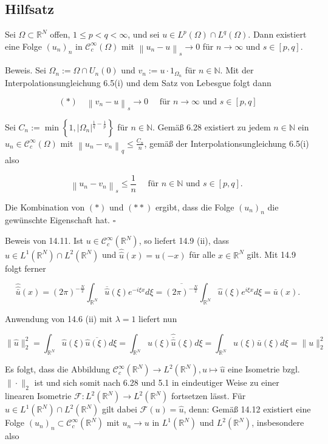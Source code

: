 \documentclass[10pt, letterpaper]{article}
\begin{document}
\subsection*{Hilfsatz}
Sei $\Omega \subset \mathbb{R}^{N}$ offen, $1 \leq p<q<\infty$, und sei $u \in L^{p}(\Omega) \cap L^{q}(\Omega)$. Dann existiert eine Folge $\left(u_{n}\right)_{n}$ in $\mathcal{C}_{c}^{\infty}(\Omega)$ mit $\left\|u_{n}-u\right\|_{s} \rightarrow 0$ für $n \rightarrow \infty$ und $s \in[p, q]$.

Beweis. Sei $\Omega_{n}:=\Omega \cap U_{n}(0)$ und $v_{n}:=u \cdot 1_{\Omega_{n}}$ für $n \in \mathbb{N}$. Mit der Interpolationsungleichung 6.5(i) und dem Satz von Lebesgue folgt dann

$$
(*) \quad\left\|v_{n}-u\right\|_{s} \rightarrow 0 \quad \text { für } n \rightarrow \infty \text { und } s \in[p, q]
$$

Sei $C_{n}:=\min \left\{1,\left|\Omega_{n}\right|^{\frac{1}{q}-\frac{1}{p}}\right\}$ für $n \in \mathbb{N}$. Gemäß 6.28 existiert zu jedem $n \in \mathbb{N}$ ein $u_{n} \in \mathcal{C}_{c}^{\infty}(\Omega)$ mit $\left\|u_{n}-v_{n}\right\|_{q} \leq \frac{C_{n}}{n}$, gemäß der Interpolationsungleichung 6.5(i) also

$$
\left\|u_{n}-v_{n}\right\|_{s} \leq \frac{1}{n} \quad \text { für } n \in \mathbb{N} \text { und } s \in[p, q] \text {. }
$$

Die Kombination von $(*)$ und $(* *)$ ergibt, dass die Folge $\left(u_{n}\right)_{n}$ die gewünschte Eigenschaft hat. \(\square\)

Beweis von 14.11. Ist $u \in \mathcal{C}_{c}^{\infty}\left(\mathbb{R}^{N}\right)$, so liefert 14.9 (ii), dass $\hat{u} \in L^{1}\left(\mathbb{R}^{N}\right) \cap L^{2}\left(\mathbb{R}^{N}\right)$ und $\hat{\hat{u}}(x)=u(-x)$ für alle $x \in \mathbb{R}^{N}$ gilt. Mit 14.9 folgt ferner

$$
\hat{\hat{\bar{u}}}(x)=(2 \pi)^{-\frac{N}{2}} \int_{\mathbb{R}^{N}} \overline{\hat{u}}(\xi) e^{-i \xi x} d \xi=\overline{(2 \pi)^{-\frac{N}{2}}} \int_{\mathbb{R}^{N}} \hat{u}(\xi) e^{i \xi x} d \xi=\bar{u}(x) .
$$

Anwendung von 14.6 (ii) mit $\lambda=1$ liefert nun

$$
\|\hat{u}\|_{2}^{2}=\int_{\mathbb{R}^{N}} \hat{u}(\xi) \overline{\hat{u}(\xi)} d \xi=\int_{\mathbb{R}^{N}} u(\xi) \hat{\overline{\hat{u}}}(\xi) d \xi=\int_{\mathbb{R}^{N}} u(\xi) \bar{u}(\xi) d \xi=\|u\|_{2}^{2}
$$

Es folgt, dass die Abbildung $\mathcal{C}_{c}^{\infty}\left(\mathbb{R}^{N}\right) \rightarrow L^{2}\left(\mathbb{R}^{N}\right), u \mapsto \hat{u}$ eine Isometrie bzgl. $\|\cdot\|_{2}$ ist und sich somit nach 6.28 und 5.1 in eindeutiger Weise zu einer linearen Isometrie $\mathcal{F}: L^{2}\left(\mathbb{R}^{N}\right) \rightarrow L^{2}\left(\mathbb{R}^{N}\right)$ fortsetzen lässt. Für $u \in L^{1}\left(\mathbb{R}^{N}\right) \cap L^{2}\left(\mathbb{R}^{N}\right)$ gilt dabei $\mathcal{F}(u)= \hat{u}$, denn: Gemäß 14.12 existiert eine Folge $\left(u_{n}\right)_{n} \subset \mathcal{C}_{c}^{\infty}\left(\mathbb{R}^{N}\right)$ mit $u_{n} \rightarrow u$ in $L^{1}\left(\mathbb{R}^{N}\right)$ und $L^{2}\left(\mathbb{R}^{N}\right)$, insbesondere also
\end{document}
